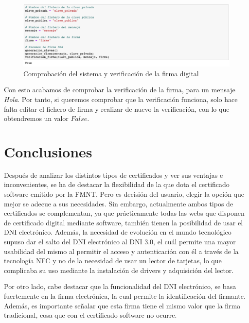 \documentclass{manual}
\begin{document}
\begin{figure}[H]
	\centering
	\includegraphics[width=145mm]{images/4}
	\caption{Comprobación del sistema y verificación de la firma digital} 
\end{figure}

Con esto acabamos de comprobar la verificación de la firma, para un mensaje \textit{Hola}. Por tanto, si queremos comprobar que la verificación funciona, solo hace falta editar el fichero de firma y realizar de nuevo la verificación, con lo que obtendremos un valor $False$.





\vspace{0.2cm}
\section{Conclusiones}


Después de analizar los distintos tipos de certificados y ver sus ventajas e inconvenientes, se ha de destacar la flexibilidad de la que dota el certificado software emitido por la FMNT. Pero es decisión del usuario, elegir la opción que mejor se adecue a sus necesidades. Sin embargo, actualmente ambos tipos de certificados se complementan, ya que prácticamente todas las webs que disponen de certificado digital mediante software, también tienen la posibilidad de usar el DNI electrónico. Además, la necesidad de evolución en el mundo tecnológico supuso dar el salto del DNI electrónico al DNI 3.0, el cuál permite una mayor usabilidad del mismo al permitir el acceso y autenticación con él a través de la tecnología NFC y no de la necesidad de usar un lector de tarjetas, lo que complicaba su uso mediante la instalación de drivers y adquisición del lector. 

Por otro lado, cabe destacar que la funcionalidad del DNI electrónico, se basa fuertemente en la firma electrónica, la cual permite la identificación del firmante. Además, es importante señalar que esta firma tiene el mismo valor que la firma tradicional, cosa que con el certificado software no ocurre.
\end{document}
